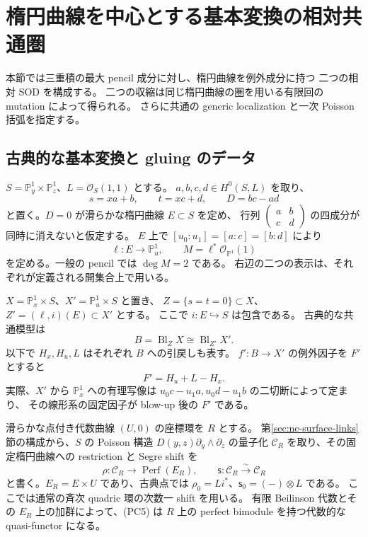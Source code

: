 \section{楕円曲線を中心とする基本変換の相対共通圏}
\label{pcat:sec}

本節では三重積の最大 pencil 成分に対し、楕円曲線を例外成分に持つ
二つの相対 SOD を構成する。
二つの収縮は同じ楕円曲線の圏を用いる有限回の mutation によって得られる。
さらに共通の generic localization と一次 Poisson 括弧を指定する。

\subsection{古典的な基本変換と gluing のデータ}

$S=\mathbb P^1_y\times\mathbb P^1_z$、$L=\mathcal O_S(1,1)$ とする。
$a,b,c,d\in H^0(S,L)$ を取り、
\[
 s=xa+b,\qquad t=xc+d,\qquad D=bc-ad
 \tag{PC1}
\]
と置く。$D=0$ が滑らかな楕円曲線 $E\subset S$ を定め、
行列 $\left(\begin{smallmatrix}a&b\\c&d\end{smallmatrix}\right)$ の四成分が
同時に消えないと仮定する。
$E$ 上で $[u_0:u_1]=[a:c]=[b:d]$ により
\[
 \ell:E\longrightarrow\mathbb P^1_u,\qquad
 M=\ell^*\mathcal O_{\mathbb P^1}(1)
 \tag{PC2}
\]
を定める。一般の pencil では $\deg M=2$ である。
右辺の二つの表示は、それぞれが定義される開集合上で用いる。

$X=\mathbb P^1_x\times S$、$X'=\mathbb P^1_u\times S$ と置き、
$Z=\{s=t=0\}\subset X$、$Z'=(\ell,i)(E)\subset X'$ とする。
ここで $i:E\hookrightarrow S$ は包含である。
古典的な共通模型は
\[
 B=\operatorname{Bl}_{Z}X\cong\operatorname{Bl}_{Z'}X'.
 \tag{PC3}
\]
以下で $H_x,H_u,L$ はそれぞれ $B$ への引戻しも表す。
$f':B\to X'$ の例外因子を $F'$ とすると
\[
                 F'=H_u+L-H_x.
                 \tag{PC4}
\]
実際、$X'$ から $\mathbb P^1_x$ への有理写像は
$u_0c-u_1a,u_0d-u_1b$ の二切断によって定まり、
その線形系の固定因子が blow-up 後の $F'$ である。

滑らかな点付き代数曲線 $(U,0)$ の座標環を $R$ とする。
第\ref{sec:nc-surface-links}節の構成から、$S$ の Poisson 構造
$D(y,z)\partial_y\wedge\partial_z$ の量子化
$\mathcal C_R$ を取り、その固定楕円曲線への restriction と
Segre shift を
\[
 \rho:\mathcal C_R\longrightarrow\operatorname{Perf}(E_R),
 \qquad \mathsf s:\mathcal C_R\xrightarrow{\sim}\mathcal C_R
 \tag{PC5}
\]
と書く。$E_R=E\times U$ であり、古典点では
$\rho_0=Li^*$、$\mathsf s_0=(-)\otimes L$ である。
ここでは通常の斉次 quadric 環の次数一 shift を用いる。
有限 Beilinson 代数とその $E_R$ 上の加群によって、(PC5) は
$R$ 上の perfect bimodule を持つ代数的な quasi-functor になる。

